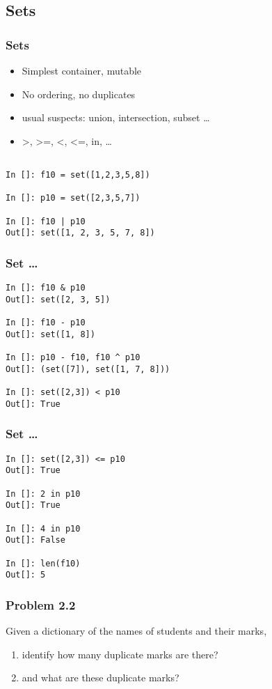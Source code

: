 \documentclass[14pt,compress]{beamer}
\begin{document}
\subsection{Sets}
\begin{frame}[fragile]
  \frametitle{Sets}
    \begin{itemize}
      \item Simplest container, mutable
      \item No ordering, no duplicates
      \item usual suspects: union, intersection, subset \ldots
      \item >, >=, <, <=, in, \ldots
    \end{itemize}
    \begin{lstlisting}

In []: f10 = set([1,2,3,5,8])

In []: p10 = set([2,3,5,7])

In []: f10 | p10
Out[]: set([1, 2, 3, 5, 7, 8])
\end{lstlisting}
\end{frame}

\begin{frame}[fragile]
  \frametitle{Set \ldots}
    \begin{lstlisting}
In []: f10 & p10
Out[]: set([2, 3, 5])

In []: f10 - p10
Out[]: set([1, 8])

In []: p10 - f10, f10 ^ p10
Out[]: (set([7]), set([1, 7, 8]))

In []: set([2,3]) < p10
Out[]: True
\end{lstlisting}
\end{frame}

\begin{frame}[fragile]
  \frametitle{Set \ldots}
    \begin{lstlisting}
In []: set([2,3]) <= p10
Out[]: True

In []: 2 in p10
Out[]: True

In []: 4 in p10
Out[]: False

In []: len(f10)
Out[]: 5
\end{lstlisting}
\end{frame}

\begin{frame}
  \frametitle{Problem 2.2}
  Given a dictionary of the names of students and their marks,

  \begin{enumerate}
  \item identify how many duplicate marks are there?
  \item and what are these duplicate marks?
  \end{enumerate}

\end{frame}
\end{document}
